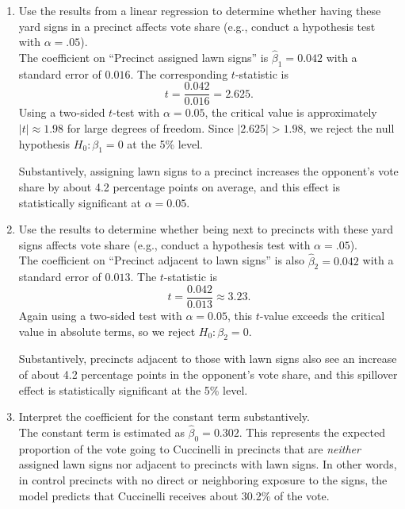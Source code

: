 \documentclass[12pt,letterpaper]{article}
\begin{document}
\vspace{.5cm}
\begin{enumerate}
  \item[(a)] Use the results from a linear regression to determine whether having these yard signs in a precinct affects vote share (e.g., conduct a hypothesis test with $\alpha = .05$).\\[0.2cm]

The coefficient on ``Precinct assigned lawn signs'' is $\hat{\beta}_1 = 0.042$ with a standard error of $0.016$. The corresponding $t$-statistic is
\[
t = \frac{0.042}{0.016} = 2.625.
\]
Using a two-sided $t$-test with $\alpha = 0.05$, the critical value is approximately $|t| \approx 1.98$ for large degrees of freedom. Since $|2.625| > 1.98$, we reject the null hypothesis $H_0 : \beta_1 = 0$ at the 5\% level. 

Substantively, assigning lawn signs to a precinct increases the opponent’s vote share by about 4.2 percentage points on average, and this effect is statistically significant at $\alpha = 0.05$.

\vspace{0.4cm}

	\item [(b)]  Use the results to determine whether being
	next to precincts with these yard signs affects vote
	share (e.g., conduct a hypothesis test with $\alpha = .05$). \\[0.2cm]
	
	\noindent   The coefficient on ``Precinct adjacent to lawn signs'' is also $\hat{\beta}_2 = 0.042$ with a standard error of $0.013$. The $t$-statistic is
	\[
	t = \frac{0.042}{0.013} \approx 3.23.
	\]
	Again using a two-sided test with $\alpha = 0.05$, this $t$-value exceeds the critical value in absolute terms, so we reject $H_0 : \beta_2 = 0$. 
	
	Substantively, precincts adjacent to those with lawn signs also see an increase of about 4.2 percentage points in the opponent’s vote share, and this spillover effect is statistically significant at the 5\% level.
	
	\vspace{0.4cm}
	
	\item [(c)] Interpret the coefficient for the constant term substantively. \\[0.2cm]
	 The constant term is estimated as $\hat{\beta}_0 = 0.302$. This represents the expected proportion of the vote going to Cuccinelli in precincts that are \emph{neither} assigned lawn signs nor adjacent to precincts with lawn signs. In other words, in control precincts with no direct or neighboring exposure to the signs, the model predicts that Cuccinelli receives about 30.2\% of the vote.
	

\end{enumerate}
\end{document}

